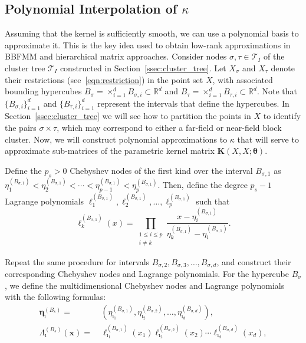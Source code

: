 \documentclass[final,3p,times]{elsarticle}
\newcommand{\mc}[1]{\mathcal{#1}}
\renewcommand{\vec}[1]{\boldsymbol{#1}}
\newcommand{\mat}[1]{\boldsymbol{#1}}
\newcommand{\R}{\mathbb{R}}
\begin{document}
\subsection{Polynomial Interpolation of \texorpdfstring{$\kappa$}{kappa}}\label{ssec:polynomial_int}
Assuming that the kernel is sufficiently smooth, we can use a polynomial basis to approximate it. This is the key idea used to obtain low-rank approximations in BBFMM and hierarchical matrix approaches. Consider nodes $\sigma, \tau \in \mc{T}_{I}$  of the cluster tree $\mc{T}_{I}$ constructed in Section~\ref{ssec:cluster_tree}. Let ${X}_{\sigma}$ and ${X}_{\tau}$ denote their restrictions (see~\eqref{eqn:restriction}) in the point set ${X}$, with  associated bounding hypercubes $B_\sigma  = \times_{i=1}^{d} B_{\sigma,i}\subset \R^d$ and $B_\tau = \times_{i=1}^{d} B_{\tau, i}\subset \R^d$. Note that $\{B_{\sigma,i}\}_{i=1}^d$ and $\{B_{\tau, i} \}_{i=1}^{d}$ represent the intervals that define the hypercubes. In Section~\ref{ssec:cluster_tree} we will see how to partition the points in $X$ to identify the pairs $\sigma\times \tau$, which may correspond to either  a far-field or near-field block cluster. Now, we will construct polynomial approximations to $\kappa$ that will serve to approximate sub-matrices of the parametric kernel matrix $\mat{K}(X, X; \vec{\theta})$.





Define the $p_{s} > 0$ Chebyshev nodes of the first kind over the interval $B_{\sigma, 1}$ as 
$ \eta_1^{(B_{\sigma, 1})} < \eta_2^{(B_{\sigma, 1})} < \cdots < \eta_{p-1}^{(B_{\sigma, 1})} < \eta_{p}^{(B_{\sigma, 1})}.$ Then, define the degree $p_{s}-1$ Lagrange polynomials $\ell_1^{(B_{\sigma, 1})}, \ell_2^{(B_{\sigma, 1})}, \dots, \ell_p^{(B_{\sigma, 1})}$ such that
\[
\ell_k^{(B_{\sigma, 1})}(x) = \prod_{\substack{1 \le i \le p \\ i \ne k}} \frac{x - \eta_i^{(B_{\sigma,1})}}{\eta_k^{(B_{\sigma, 1})} - \eta_i^{(B_{\sigma, 1})}}.
\]

Repeat the same procedure for intervals $B_{\sigma, 2}, B_{\sigma,3}, \dots, B_{\sigma, d}$, and construct their corresponding Chebyshev nodes and Lagrange polynomials. For the hypercube $B_{\sigma}$, we define the multidimensional Chebyshev nodes and Lagrange polynomials with the following formulas:
$$\begin{aligned}\vec{\eta}^{(B_s)}_{\vec{\imath}} = & \>  (\eta^{(B_{\sigma, 1})}_{\imath_1}, \eta^{(B_{\sigma, 2})}_{\imath_2}, \dots, \eta^{(B_{\sigma,d})}_{\imath_d}), \\ \Lambda_{\vec{\imath}}^{(B_s)}(\vec{x}) = & \> \ell_{\imath_1}^{(B_{\sigma, 1})}(x_1) \ell_{\imath_2}^{(B_{\sigma, 2})}(x_2) \cdots \ell_{\imath_d}^{{(B_{\sigma,d})}}(x_d),\end{aligned}$$ 
\end{document}
